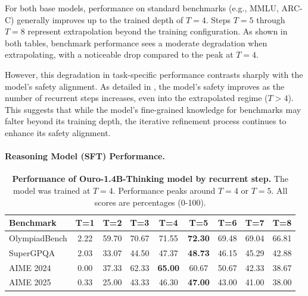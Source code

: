 \documentclass[]{bytedance_seed}
\newcommand{\1}{\mathbf{1}}
\begin{document}
For both base models, performance on standard benchmarks (e.g., MMLU, ARC-C) generally improves up to the trained depth of $T=4$. Steps $T=5$ through $T=8$ represent extrapolation beyond the training configuration. As shown in both tables, benchmark performance sees a moderate degradation when extrapolating, with a noticeable drop compared to the peak at $T=4$.

However, this degradation in task-specific performance contrasts sharply with the model's safety alignment. As detailed in , the model's safety improves as the number of recurrent steps increases, even into the extrapolated regime ($T>4$). This suggests that while the model's fine-grained knowledge for benchmarks may falter beyond its training depth, the iterative refinement process continues to enhance its safety alignment.

\paragraph{Reasoning Model (SFT) Performance.}

\begin{table}
\centering
\caption{\textbf{Performance of Ouro-1.4B-Thinking model by recurrent step.} The model was trained at $T=4$. Performance peaks around $T=4$ or $T=5$. All scores are percentages (0-100).}
\label{tab:extrapolation_thinking_1_4b}
\small
\setlength{\tabcolsep}{5pt}
\begin{tabular}{@{}l|cccccccc@{}}
\toprule
\textbf{Benchmark} & \textbf{T=1} & \textbf{T=2} & \textbf{T=3} & \textbf{T=4} & \textbf{T=5} & \textbf{T=6} & \textbf{T=7} & \textbf{T=8} \\
\midrule
OlympiadBench & 2.22 & 59.70 & 70.67 & 71.55 & \textbf{72.30} & 69.48 & 69.04 & 66.81 \\
SuperGPQA     & 2.03 & 33.07 & 44.50 & 47.37 & \textbf{48.73} & 46.15 & 45.29 & 42.88 \\
AIME 2024     & 0.00 & 37.33 & 62.33 & \textbf{65.00} & 60.67 & 50.67 & 42.33 & 38.67 \\
AIME 2025     & 0.33 & 25.00 & 43.33 & 46.30 & \textbf{47.00} & 43.00 & 41.00 & 38.00 \\
\bottomrule
\end{tabular}
\end{table}
\end{document}
